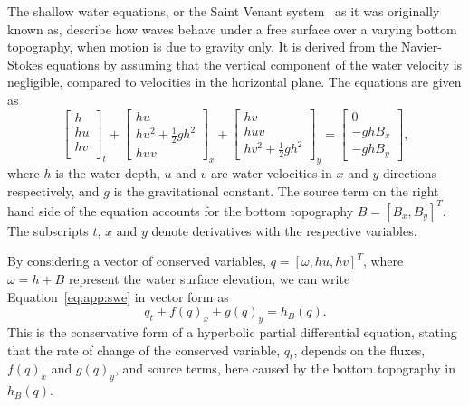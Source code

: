 \documentclass[11pt, a4paper]{article}
\begin{document}
The shallow water equations, or the Saint Venant system~\cite{saintVenant} as it was originally known as, describe how waves behave under a free surface over a varying bottom topography, when motion is due to gravity only.
It is derived from the Navier-Stokes equations by assuming that the vertical component of the water velocity is negligible, compared to velocities in the horizontal plane.
The equations are given as 
\begin{equation}
	\left[ \begin{matrix} h \\ hu \\ hv \\ \end{matrix} \right]_t
	 + \left[ \begin{matrix} hu \\ hu^2 + \frac{1}{2} gh^2 \\ huv \end{matrix} \right]_x
	 + \left[ \begin{matrix} hv \\ huv \\ hv^2 + \frac{1}{2} gh^2 \end{matrix} \right]_y 
	 = \left[ \begin{matrix} 0 \\ -ghB_x \\ -ghB_y \end{matrix} \right],
	 \label{eq:app:sweasd}
\end{equation}
where $h$ is the water depth, $u$ and $v$ are water velocities in $x$ and $y$ directions respectively, and $g$ is the gravitational constant. The source term on the right hand side of the equation accounts for the bottom topography $B = [B_x, B_y]^T$. The subscripts $t$, $x$ and $y$ denote derivatives with the respective variables.

By considering a vector of conserved variables, $q = [\omega, hu, hv]^T$, where $\omega = h + B$ represent the water surface elevation, we can write Equation~\eqref{eq:app:swe} in vector form as
\begin{equation}
	q_t  + f(q)_x + g(q)_y = h_B(q).
	\label{eq:swevec}
\end{equation}
This is the conservative form of a hyperbolic partial differential equation, stating that the rate of change of the conserved variable,  $q_t$, depends on the fluxes, $f(q)_x$ and $g(q)_y$, and source terms, here caused by the bottom topography in $h_B(q)$.
\end{document}
